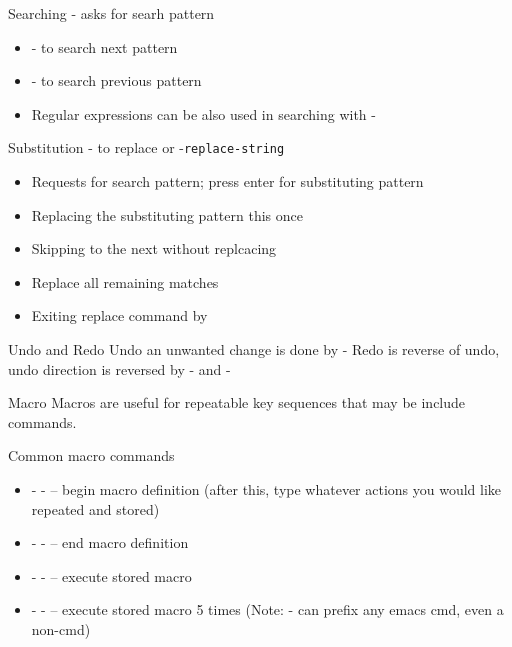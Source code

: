 \documentclass[newPxFont,sthlmFooter,nooffset]{beamer}
\begin{document}
\begin{frame}[t]{Searching}
- asks for searh pattern
\begin{itemize}
\item {}- to search next pattern
\item {}- to search previous pattern
\item Regular expressions can be also used in searching with -
\end{itemize}

\end{frame}

\begin{frame}[t]{Substitution}
-\keystroke{$\%$} to replace or -\texttt{replace-string}
\begin{itemize}
\item Requests for search pattern; press enter for substituting pattern
\item Replacing the substituting pattern this once 
\item Skipping to the next without replcacing 
\item Replace all remaining matches \keystroke{!}
\item Exiting replace command by 
\end{itemize}

\end{frame}


\begin{frame}[t]{Undo and Redo}
Undo an unwanted change is done by -\keystroke{\_}
\bigskip
Redo is reverse of undo, undo direction is reversed by - and -\keystroke{\_}

\end{frame}


\begin{frame}[t]{Macro}
Macros are useful for repeatable key sequences that may be include commands.

\bigskip
Common macro commands
\begin{itemize}
\item {}- - \keystroke{(}– begin macro definition (after this, type whatever actions you would like repeated and stored)
\item {}- - \keystroke{)}– end macro definition
\item {}- -  – execute stored macro
\item {}-  - – execute stored macro 5 times (Note: - can prefix any emacs cmd, even a non-cmd)
\end{itemize}
\end{frame}
\end{document}
